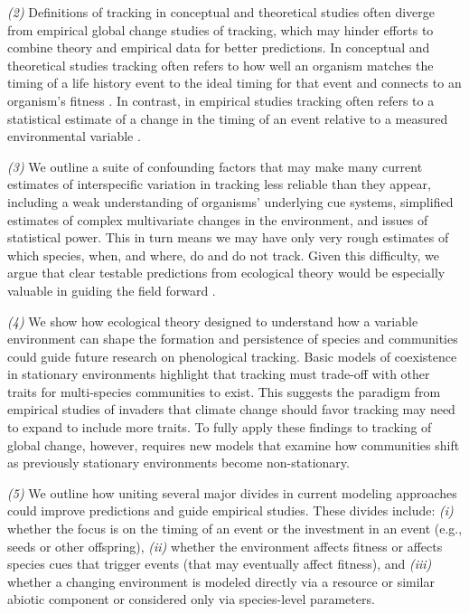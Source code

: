 \documentclass[11pt,letterpaper]{article}
\begin{document}
\emph{(2)} Definitions of tracking in conceptual and theoretical studies often diverge from empirical global change studies of tracking, which may hinder efforts to combine theory and empirical data for better predictions. In conceptual and theoretical studies tracking often refers to how well an organism matches the timing of a life history event to the ideal timing for that event and connects to an organism's fitness \citep{vissergienapp2019}. In contrast, in empirical studies tracking often refers to a statistical estimate of a change in the timing of an event relative to a measured environmental variable \citep[][]{chmura2019}. 

\emph{(3)} We outline a suite of confounding factors that may make many current estimates of interspecific variation in tracking less reliable than they appear, including a weak understanding of organisms' underlying cue systems, simplified estimates of complex multivariate changes in the environment, and issues of statistical power. This in turn means we may have only very rough estimates of which species, when, and where, do and do not track. Given this difficulty, we argue that clear testable predictions from ecological theory would be especially valuable in guiding the field forward \citep{Smaldino2016}.  

\emph{(4)} We show how ecological theory designed to understand how a variable environment can shape the formation and persistence of species and communities could guide future research on phenological tracking.  Basic models of coexistence in stationary environments highlight that tracking must trade-off with other traits for multi-species communities to exist. This suggests the paradigm from empirical studies of invaders that climate change should favor tracking may need to expand to include more traits. To fully apply these findings to tracking of global change, however, requires new models that examine how communities shift as previously stationary environments become non-stationary.

\emph{(5)}  We outline how uniting several major divides in current modeling approaches could improve predictions and guide empirical studies. These divides include: \emph{(i)} whether the focus is on the timing of an event or the investment in an event (e.g., seeds or other offspring), \emph{(ii)} whether the environment affects fitness or affects species cues that trigger events (that may eventually affect fitness), and \emph{(iii)} whether a changing environment is modeled directly via a resource or similar abiotic component or considered only via species-level parameters. 
\end{document}
